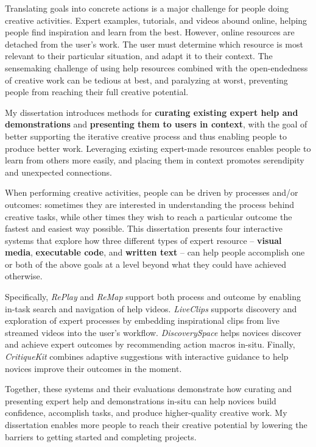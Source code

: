 Translating goals into concrete actions is a major challenge for people doing creative activities. Expert examples, tutorials, and videos abound online, helping people find inspiration and learn from the best. However, online resources are detached from the user’s work. The user must determine which resource is most relevant to their particular situation, and adapt it to their context. The sensemaking challenge of using help resources combined with the open-endedness of creative work can be tedious at best, and paralyzing at worst, preventing people from reaching their full creative potential.

My dissertation introduces methods for \textbf{curating existing expert help and demonstrations} and \textbf{presenting them to users in context}, with the goal of better supporting the iterative creative process and thus enabling people to produce better work. Leveraging existing expert-made resources enables people to learn from others more easily, and placing them in context promotes serendipity and unexpected connections.

When performing creative activities, people can be driven by processes and/or outcomes: sometimes they are interested in understanding the process behind creative tasks, while other times they wish to reach a particular outcome the fastest and easiest way possible. This dissertation presents four interactive systems that explore how three different types of expert resource -- \textbf{visual media}, \textbf{executable code}, and \textbf{written text} -- can help people accomplish one or both of the above goals at a level beyond what they could have achieved otherwise.

Specifically, \textit{RePlay} and \textit{ReMap} support both process and outcome by enabling in-task search and navigation of help videos. \textit{LiveClips} supports discovery and exploration of expert processes by embedding inspirational clips from live streamed videos into the user’s workflow. \textit{DiscoverySpace} helps novices discover and achieve expert outcomes by recommending action macros in-situ. Finally, \textit{CritiqueKit} combines adaptive suggestions with interactive guidance to help novices improve their outcomes in the moment.

Together, these systems and their evaluations demonstrate how curating and presenting expert help and demonstrations in-situ can help novices build confidence, accomplish tasks, and produce higher-quality creative work. My dissertation enables more people to reach their creative potential by lowering the barriers to getting started and completing projects.
